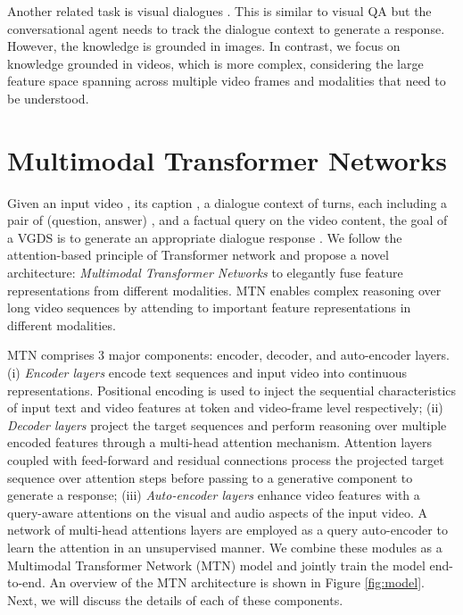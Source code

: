 \documentclass[11pt,a4paper]{article}
\begin{document}
Another related task is visual dialogues \cite{das2017visual,das2017learning,kottur2018visual}. This is similar to visual QA but the conversational agent needs to track the dialogue context to generate a response. However, the knowledge is grounded in images. In contrast, we focus on knowledge grounded in videos, which is more complex, considering the large feature space spanning across multiple video frames and modalities that need to be understood. 

\section{Multimodal Transformer Networks}

Given an input video , its caption , a dialogue context of  turns, each including a pair of (question, answer) , and a factual query  on the video content, the goal of a VGDS is to generate an appropriate dialogue response . We follow the attention-based principle of Transformer network \cite{vaswani17attention}  and propose a novel architecture: \textit{Multimodal Transformer Networks} to elegantly fuse feature representations from different modalities. MTN enables complex reasoning over long video sequences by attending to important feature representations in different modalities. 

MTN comprises 3 major components: encoder, decoder, and auto-encoder layers. (i) \textit{Encoder layers} encode text sequences and input video into continuous representations. Positional encoding is used to inject the sequential characteristics of input text and video features at token and video-frame level respectively;  (ii) \textit{Decoder layers} project the target sequences and perform reasoning over multiple encoded features through a multi-head attention mechanism. Attention layers coupled with feed-forward and residual connections process the projected target sequence over  attention steps before passing to a generative component to generate a response; (iii) \textit{Auto-encoder layers} enhance video features with a query-aware attentions on the visual and audio aspects of the input video. A network of multi-head attentions layers are employed as a query auto-encoder to learn the attention in an unsupervised manner. We combine these modules as a Multimodal Transformer Network (MTN) model and jointly train the model end-to-end. An overview of the MTN architecture is shown in Figure \ref{fig:model}. Next, we will discuss the details of each of these components.
\end{document}
